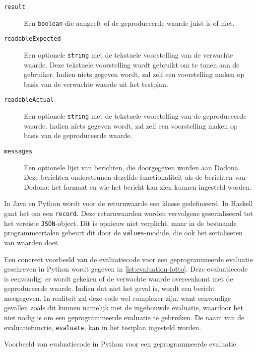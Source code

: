 \begin{description}
    \item[\texttt{result}] Een \texttt{boolean} die aangeeft of de geproduceerde waarde juist is of niet.
    \item[\texttt{readableExpected}] Een optionele \texttt{string} met de tekstuele voorstelling van de verwachte waarde.
    Deze tekstuele voorstelling wordt gebruikt om te tonen aan de gebruiker.
    Indien niets gegeven wordt, zal \tested{} zelf een voorstelling maken op basis van de verwachte waarde uit het testplan.
    \item[\texttt{readableActual}] Een optionele \texttt{string} met de tekstuele voorstelling van de geproduceerde waarde.
    Indien niets gegeven wordt, zal \tested{} zelf een voorstelling maken op basis van de geproduceerde waarde.
    \item[\texttt{messages}] Een optionele lijst van berichten, die doorgegeven worden aan Dodona.
    Deze berichten ondersteunen dezelfde functionaliteit als de berichten van Dodona: het formaat en wie het bericht kan zien kunnen ingesteld worden.
\end{description}

In Java en Python wordt voor de returnwaarde een klasse gedefinieerd.
In Haskell gaat het om een \texttt{record}.
Deze returnwaarden worden vervolgens geserialiseerd tot het vereiste \texttt{JSON}-object.
Dit is opnieuw niet verplicht, maar in de bestaande programmeertalen gebeurt dit door de \texttt{values}-module, die ook het serialiseren van waarden doet.

Een concreet voorbeeld van de evaluatiecode voor een geprogrammeerde evaluatie geschreven in Python wordt gegeven in \cref{lst:evaluation-lotto}.
Deze evaluatiecode is eenvoudig: er wordt gekeken of de verwachte waarde overeenkomt met de geproduceerde waarde.
Indien dat niet het geval is, wordt een bericht meegegeven.
In realiteit zal deze code wel complexer zijn, want eenvoudige gevallen zoals dit kunnen namelijk met de ingebouwde evaluatie, waardoor het niet nodig is om een geprogrammeerde evaluatie te gebruiken.
De naam van de evaluatiefunctie, \texttt{evaluate}, kan in het testplan ingesteld worden.

\begin{listing}
    \caption{Voorbeeld van evaluatiecode in Python voor een geprogrammeerde evaluatie.}
    \label{lst:evaluation-lotto}
    \inputminted{python}{code/evaluator.py}
\end{listing}

